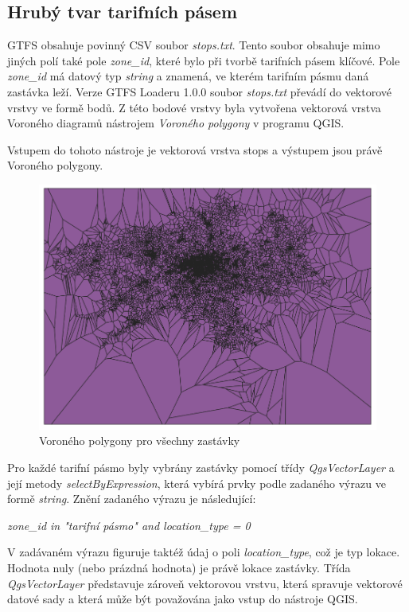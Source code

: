 \subsection{Hrubý tvar tarifních pásem}

GTFS obsahuje povinný CSV soubor \textit{stops.txt}. Tento soubor obsahuje mimo
jiných polí také pole \textit{zone\_id}, které bylo při tvorbě tarifních pásem klíčové. 
Pole \textit{zone\_id} má datový typ \textit{string} a znamená, ve kterém tarifním
pásmu daná zastávka leží. Verze GTFS Loaderu 1.0.0 soubor \textit{stops.txt} převádí do vektorové vrstvy
ve formě bodů. Z této bodové vrstvy byla vytvořena vektorová vrstva Voroného 
diagramů nástrojem \textit{Voroného polygony} v programu QGIS. 

Vstupem do tohoto nástroje je vektorová vrstva stops a výstupem jsou právě Voroného polygony.

\begin{figure}[H] \centering
    \includegraphics[width=400pt]{./pictures/voronoi-stops.png}
    \caption[Voroného polygony pro všechny zastávky]{Voroného polygony pro všechny zastávky}
	\label{fig:voronoi-stops}              
\end{figure}
  
Pro každé tarifní pásmo byly vybrány zastávky pomocí třídy \textit{QgsVectorLayer}
a její metody \textit{selectByExpression}, která vybírá prvky podle zadaného výrazu ve formě \textit{string}.
Znění zadaného výrazu je následující:

\textit{zone\_id in "tarifní pásmo" and location\_type = 0}

V zadávaném výrazu figuruje taktéž údaj o poli \textit{location\_type}, což je typ lokace. 
Hodnota nuly (nebo prázdná hodnota) je právě lokace zastávky. 
Třída \textit{QgsVectorLayer} představuje zároveň vektorovou vrstvu, která spravuje
vektorové datové sady a která může být považována jako vstup do nástroje QGIS. %

